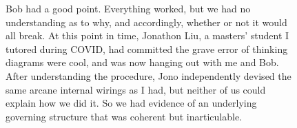 \begin{figure}[h!]
\centering
{}
\end{figure}

\begin{figure}[h!]
\centering
{}
\end{figure}

\begin{figure}[h!]
\centering
{}
\caption{Bob had a good point. Everything worked, but we had no understanding as to why, and accordingly, whether or not it would all break. At this point in time, Jonathon Liu, a masters' student I tutored during COVID, had committed the grave error of thinking diagrams were cool, and was now hanging out with me and Bob. After understanding the procedure, Jono independently devised the same arcane internal wirings as I had, but neither of us could explain how we did it. So we had evidence of an underlying governing structure that was coherent but inarticulable.}
\end{figure}

